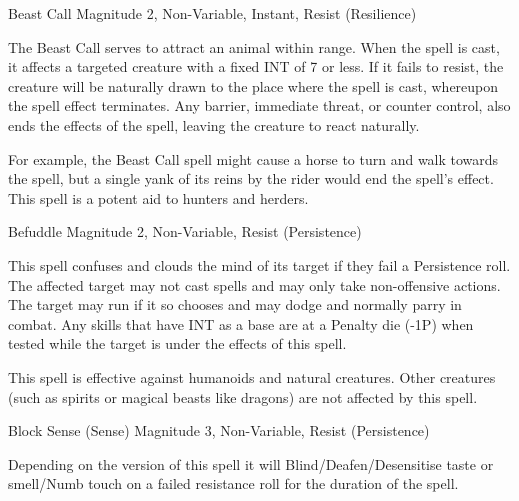 %



\begin{rpg-spell}
{Beast Call}
{Magnitude 2, Non-Variable, Instant, Resist (Resilience)}

The Beast Call serves to attract an animal within range. When the spell is cast, it affects a targeted creature with a fixed INT of 7 or less. If it fails to resist, the creature will be naturally drawn to the place where the spell is cast, whereupon the spell effect terminates. Any barrier, immediate threat, or counter control, also ends the effects of the spell, leaving the creature to react naturally. 

For example, the Beast Call spell might cause a horse to turn and walk towards the spell, but a single yank of its reins by the rider would end the spell’s effect. This spell is a potent aid to hunters and herders.
\end{rpg-spell}




\begin{rpg-spell}
{Befuddle}
{Magnitude 2, Non-Variable, Resist (Persistence)}

This spell confuses and clouds the mind of its target if they fail a Persistence roll. The affected target may not cast spells and may only take non-offensive actions. The target may run if it so chooses and may dodge and normally parry in combat. Any skills that have INT as a base are at a Penalty die (-1P) when tested while the target is under the effects of this spell.

This spell is effective against humanoids and natural creatures. Other creatures (such as spirits or magical beasts like dragons) are not affected by this spell.
\end{rpg-spell}


\begin{rpg-spell}
  {Block Sense (Sense)}
{Magnitude 3, Non-Variable, Resist (Persistence)}

Depending on the version of this spell it will Blind/Deafen/Desensitise taste or smell/Numb touch on a failed resistance roll for the duration of the spell.
\end{rpg-spell}


